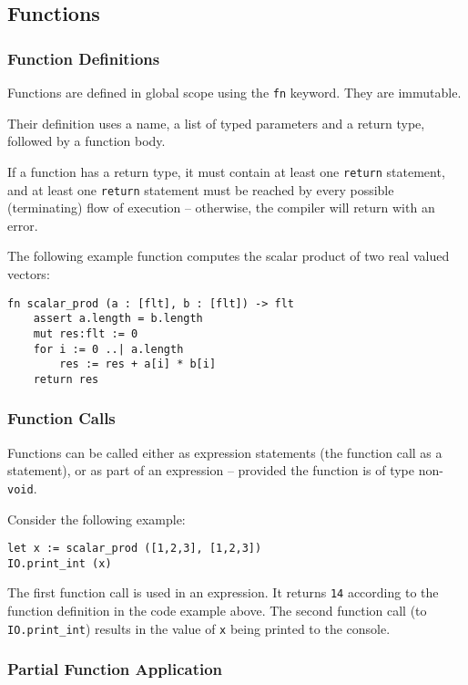\documentclass{article}
\newcommand{\code}[1]{\lstinline[columns=fixed]{#1}}
\begin{document}
		\subsection{Functions}
		
			\subsubsection{Function Definitions}
			
				Functions are defined in global scope using the \code{fn} keyword. They are immutable.
				
				Their definition uses a name, a list of typed parameters and a return type, followed by a function body.
				
				If a function has a return type, it must contain at least one \code{return} statement, and at least one \code{return} statement must be reached by every possible (terminating) flow of execution -- otherwise, the compiler will return with an error.
				
				The following example function computes the scalar product of two real valued vectors:
				
				\begin{lstlisting}
fn scalar_prod (a : [flt], b : [flt]) -> flt
	assert a.length = b.length
	mut res:flt := 0
	for i := 0 ..| a.length
		res := res + a[i] * b[i]
	return res
				\end{lstlisting}
				
			\subsubsection{Function Calls}
			
				Functions can be called either as expression statements (the function call as a statement), or as part of an expression -- provided the function is of type non-\code{void}.
				
				Consider the following example:
				
				\begin{lstlisting}
let x := scalar_prod ([1,2,3], [1,2,3])
IO.print_int (x)
				\end{lstlisting}
				
				The first function call is used in an expression. It returns \texttt{14} according to the function definition in the code example above. The second function call (to \code{IO.print_int}) results in the value of \code{x} being printed to the console.
				
			\subsubsection{Partial Function Application}
			
\end{document}
